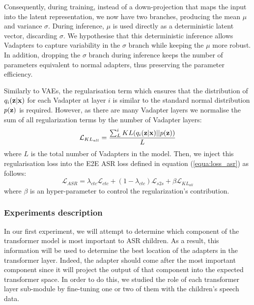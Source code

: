 Consequently, during training, instead of a down-projection that maps the input into the latent representation, we now have two branches, producing the mean $\mu$ and variance $\sigma$. During inference, $\mu$ is used directly as a deterministic latent vector, discarding $\sigma$. We hypothesise that this deterministic inference allows Vadapters to capture variability in the $\sigma$ branch while keeping the $\mu$ more robust. In addition, dropping the $\sigma$ branch during inference keeps the number of parameters equivalent to normal adapters, thus preserving the parameter efficiency.

Similarly to VAEs, the regularisation term which ensures that the distribution of $q_{i}(\vb{z}| \vb{x})$ for each Vadapter at layer $i$ is similar to the standard normal distribution $p(\vb{z})$ is required. However, as there are many Vadapter layers we normalise the sum of all regularization terms by the number of Vadapter layers: 
\begin{equation}
    \mathcal{L}_{KL_{all}}  = \frac{\sum_L^iKL(q_{i}(\vb{z}|\vb{x})|| p(\vb{z}))}{L} \\
\end{equation}
where $L$ is the total number of Vadapters in the model. 
Then, we inject this regularisation loss into the E2E ASR loss defined in equation (\ref{equa:loss_asr}) as follows:
\begin{equation}\label{loss}
    \mathcal{L}_{ASR} = \lambda_{ctc} \mathcal{L}_{ctc} + (1- \lambda_{ctc})\mathcal{L}_{s2s}  + \beta \mathcal{L}_{KL_{all}} 
\end{equation}
where $\beta$ is an hyper-parameter to control the regularization's contribution.


\subsubsection{Experiments description}
In our first experiment, we will attempt to determine which component of the transformer model is most important to ASR children. As a result, this information will be used to determine the best location of the adapters in the transformer layer. Indeed, the adapter should come after the most important component since it will project the output of that component into the expected transformer space. In order to do this, we studied the role of each transformer layer sub-module by fine-tuning one or two of them with the children's speech data.


